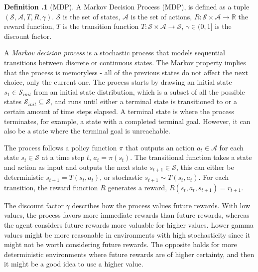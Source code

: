 \documentclass[12pt,A4]{report}
\theoremstyle{definition}
\begin{document}
\begin{displayquote}
  \textbf{Definition \thesection.1} (MDP).
  A Markov Decision Process (MDP), is defined as a tuple $(\mathcal{S}, \mathcal{A}, T, R, \gamma)$. $\mathcal{S}$ is the set of states, $\mathcal{A}$ is the set of actions, $R: \mathcal{S} \times \mathcal{A} \rightarrow \mathbb{R}$ the reward function, $T$ is the transition function $T: \mathcal{S} \times \mathcal{A} \rightarrow \mathcal{S}$, $\gamma \in (0, 1]$ is the discount factor.
\end{displayquote}

A \textit{Markov decision process} is a stochastic process that models sequential transitions between discrete or continuous states. The Markov property implies that the process is memoryless - all of the previous states do not affect the next choice, only the current one.  The process starts by drawing an initial state $s_1 \in \mathcal{S}_{init}$ from an initial state distribution, which is a subset of all the possible states $\mathcal{S}_{init} \subseteq \mathcal{S}$, and runs until either a terminal state is transitioned to or a certain amount of time steps elapsed. A terminal state is where the process terminates, for example, a state with a completed terminal goal. However, it can also be a state where the terminal goal is unreachable.

The process follows a policy function $\pi$ that outputs an action $a_t \in \mathcal{A}$ for each state $s_t \in \mathcal{S}$ at a time step $t$, $a_t = \pi(s_t)$. The transitional function takes a state and action as input and outputs the next state $s_{t+1} \in \mathcal{S}$, this can either be deterministic $s_{t+1} = T(s_t, a_t)$, or stochastic $s_{t+1} \sim T(s_t, a_t)$. For each transition, the reward function $R$  generates a reward, $R(s_t, a_t, s_{t+1}) = r_{t+1}$. 



The discount factor $\gamma$ describes how the process values future rewards. With low values, the process favors more immediate rewards than future rewards, whereas the agent considers future rewards more valuable for higher values. Lower gamma values might be more reasonable in environments with high stochasticity since it might not be worth considering future rewards. The opposite holds for more deterministic environments where future rewards are of higher certainty, and then it might be a good idea to use a higher value.
\end{document}
